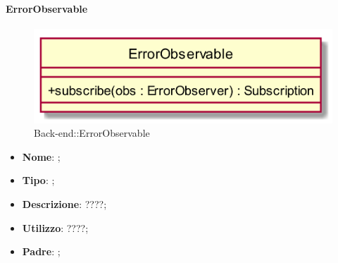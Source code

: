 \hypertarget{ErrorObservable_label}{\paragraph{ErrorObservable}}
\begin{figure}[h]
	\centering
	\includegraphics[width=\textwidth,height=\textheight,keepaspectratio]{images/ClassErrorObservable.png}
	\caption{Back-end::ErrorObservable}
\end{figure}
\begin{itemize}
	\item \textbf{Nome}: ;
	\item \textbf{Tipo}: ;
	\item \textbf{Descrizione}: ????;
	\item \textbf{Utilizzo}: ????;
	\item \textbf{Padre}: ;
\end{itemize}

